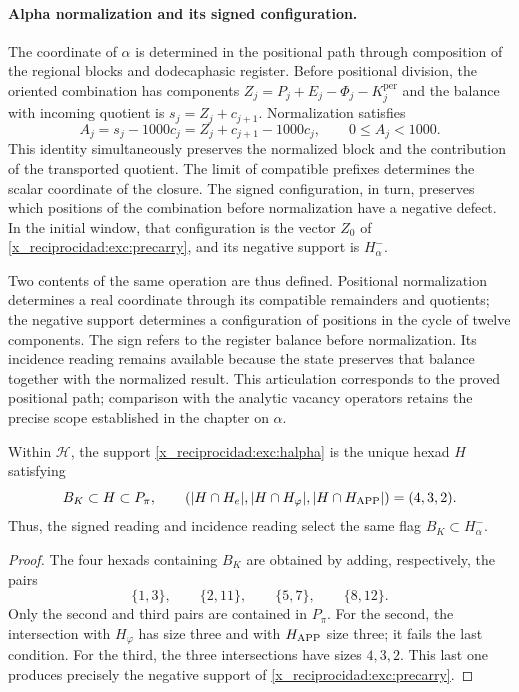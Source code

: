 \paragraph{Alpha normalization and its signed configuration.}
\label{x_reciprocidad:inc-ampl-clausura}
The coordinate of $\alpha$ is determined in the positional path through
composition of the regional blocks and dodecaphasic register. Before
positional division, the oriented combination has components
$Z_j=P_j+E_j-\Phi_j-K_j^{\mathrm{per}}$ and the balance with incoming quotient
is $s_j=Z_j+c_{j+1}$. Normalization satisfies
\begin{equation}
 A_j=s_j-1000c_j=Z_j+c_{j+1}-1000c_j,\qquad 0\leq A_j<1000.
 \label{x_reciprocidad:inc-ampl-normalizacion}
\end{equation}
This identity simultaneously preserves the normalized block and the
contribution of the transported quotient. The limit of compatible
prefixes determines the scalar coordinate of the closure. The
signed configuration, in turn, preserves which positions of the
combination before normalization have a negative defect.
In the initial window, that configuration is the vector $Z_0$ of
\eqref{x_reciprocidad:exc:precarry}, and its negative support is $H^-_\alpha$.

Two contents of the same operation are thus defined. Positional
normalization determines a real coordinate through its compatible
remainders and quotients; the negative support determines a
configuration of positions in the cycle of twelve components. The sign
refers to the register balance before normalization. Its incidence
reading remains available because the state preserves that balance
together with the normalized result. This articulation corresponds to the
proved positional path; comparison with the analytic vacancy
operators retains the precise scope established in the chapter on
$\alpha$.



\begin{proposition}
\label{x_reciprocidad:exc:selector-bandera}
Within $\mathcal H$, the support \eqref{x_reciprocidad:exc:halpha} is the unique hexad
$H$ satisfying
\[
 B_K\subset H\subset P_\pi,
 \qquad
 (|H\cap H_e|,|H\cap H_\varphi|,|H\cap H_{\rm APP}|)=(4,3,2).
\]
Thus, the signed reading and incidence reading select the same
flag $B_K\subset H^-_\alpha$.
\end{proposition}

\begin{proof}
The four hexads containing $B_K$ are obtained by adding,
respectively, the pairs
\[
 \{1,3\},\qquad\{2,11\},\qquad\{5,7\},\qquad\{8,12\}.
\]
Only the second and third pairs are contained in $P_\pi$. For the
second, the intersection with $H_\varphi$ has size three and with
$H_{\rm APP}$ size three; it fails the last condition. For the
third, the three intersections have sizes $4,3,2$. This last one
produces precisely the negative support of \eqref{x_reciprocidad:exc:precarry}.
\end{proof}

